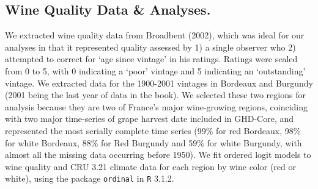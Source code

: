 \documentclass[final]{nature}
\begin{document}
\begin{methods}
\subsection{Wine Quality Data \& Analyses.}
\noindent We extracted wine quality data from Broadbent (2002)\cite{Broadbent2002}, which was ideal for our analyses in that it represented quality assessed by 1) a single observer who 2) attempted to correct for `age since vintage' in his ratings. Ratings were scaled from 0 to 5, with 0 indicating a `poor' vintage and 5 indicating an `outstanding' vintage. We extracted data for the 1900-2001 vintages in Bordeaux and Burgundy (2001 being the last year of data in the book). We selected these two regions for analysis because they are two of France's major wine-growing regions, coinciding with two major time-series of grape harvest date included in GHD-Core, and represented the most serially complete time series (99\% for red Bordeaux, 98\% for white Bordeaux, 88\% for Red Burgundy and 59\% for white Burgundy, with almost all the missing data occurring before 1950). We fit ordered logit models to wine quality and CRU 3.21 climate data for each region by wine color (red or white), using the package \verb|ordinal| in \verb|R| 3.1.2\cite{Rcore2014}.

\end{methods}





\end{document}
